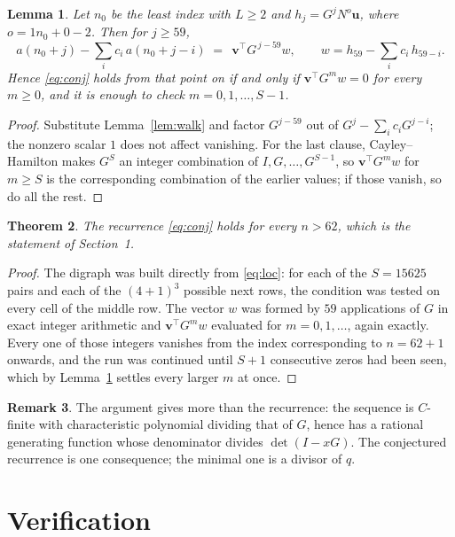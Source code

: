 \documentclass[11pt,a4paper]{article}
\theoremstyle{plain}
\newtheorem{theorem}{Theorem}
\newtheorem{lemma}[theorem]{Lemma}
\theoremstyle{definition}
\newtheorem{remark}[theorem]{Remark}
\begin{document}
\begin{lemma}\label{lem:crit}
Let $n_0$ be the least index with $L\ge2$ and $h_j=G^{j}N^{o}\mathbf{u}$, where
$o=1n_0+0-2$. Then for $j\ge59$,
\[
a(n_0+j)-\sum_i c_i\,a(n_0+j-i)\;=\;\,\mathbf{v}^{\!\top}G^{\,j-59}w,
\qquad w=h_{59}-\sum_i c_i\,h_{59-i} .
\]
Hence \eqref{eq:conj} holds from that point on if and only if
$\mathbf{v}^{\!\top}G^{m}w=0$ for every $m\ge0$, and it is enough to check
$m=0,1,\dots,S-1$.
\end{lemma}

\begin{proof}
Substitute Lemma~\ref{lem:walk} and factor $G^{j-59}$ out of
$G^{j}-\sum_ic_iG^{j-i}$; the nonzero scalar $1$ does not affect
vanishing. For the last clause, Cayley--Hamilton makes $G^{S}$ an integer combination of
$I,G,\dots,G^{S-1}$, so $\mathbf{v}^{\!\top}G^{m}w$ for $m\ge S$ is the corresponding
combination of the earlier values; if those vanish, so do all the rest.
\end{proof}

\begin{theorem}
The recurrence \eqref{eq:conj} holds for every $n>62$, which is the statement of
Section~1.
\end{theorem}

\begin{proof}
The digraph was built directly from \eqref{eq:loc}: for each of the $S=15625$ pairs and each
of the $(4+1)^{3}$ possible next rows, the condition was tested on every cell of
the middle row. The vector $w$ was formed by $59$ applications of $G$ in exact integer
arithmetic and $\mathbf{v}^{\!\top}G^{m}w$ evaluated for $m=0,1,\dots$, again exactly.
Every one of those integers vanishes from the index corresponding to $n=62+1$ onwards,
and the run was continued until $S+1$ consecutive zeros had been seen, which by
Lemma~\ref{lem:crit} settles every larger $m$ at once.
\end{proof}

\begin{remark}
The argument gives more than the recurrence: the sequence is $C$-finite with characteristic
polynomial dividing that of $G$, hence has a rational generating function whose denominator
divides $\det(I-xG)$. The conjectured recurrence is one consequence; the minimal one is a
divisor of $q$.
\end{remark}

\section{Verification}
\end{document}
